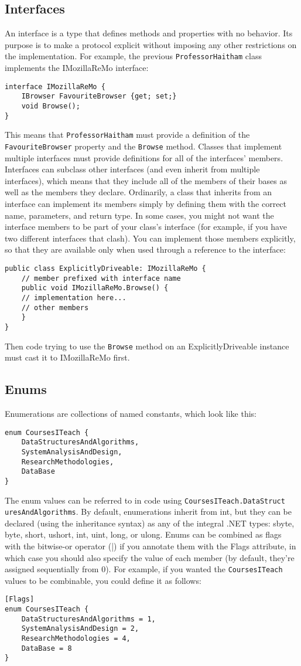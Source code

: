 \documentclass[12pt,a4paper,final,twoside,onecolumn,titlepage]{book}
\begin{document}
\subsection{Interfaces}
An interface is a type that defines methods and properties with no behavior. Its purpose is to make a protocol explicit without imposing any other restrictions on the implementation. For example, the previous \texttt{ProfessorHaitham} class implements the IMozillaReMo interface:
\begin{lstlisting}
interface IMozillaReMo {
	IBrowser FavouriteBrowser {get; set;} 
	void Browse();
}
\end{lstlisting}
This means that \texttt{ProfessorHaitham} must provide a definition of the \texttt{FavouriteBrowser} property and the \texttt{Browse} method. Classes that implement multiple interfaces must provide definitions for all of the interfaces’ members. Interfaces can subclass other interfaces (and even inherit from multiple interfaces), which means that they include all of the members of their bases as well as the members they declare.
Ordinarily, a class that inherits from an interface can implement its members simply by defining them with the correct name, parameters, and return type. In some cases, you might not want the interface members to be part of your class’s interface (for example, if you have two different interfaces that clash). You can implement those members explicitly, so that they are available only when used through a reference to the interface:
\begin{lstlisting}
public class ExplicitlyDriveable: IMozillaReMo { 
	// member prefixed with interface name 
	public void IMozillaReMo.Browse() {
	// implementation here... 
	// other members
	}
}
\end{lstlisting}
Then code trying to use the \texttt{Browse} method on an ExplicitlyDriveable instance
must cast it to IMozillaReMo first.
\subsection{Enums}
Enumerations are collections of named constants, which look like this:
\begin{lstlisting}
enum CoursesITeach { 
	DataStructuresAndAlgorithms,
	SystemAnalysisAndDesign, 
	ResearchMethodologies, 
	DataBase
}
\end{lstlisting}
The enum values can be referred to in code using \texttt{CoursesITeach.DataStruct\\uresAndAlgorithms}. By default, enumerations inherit from int, but they can be declared (using the inheritance syntax) as any of the integral .NET types: sbyte, byte, short, ushort, int, uint, long, or ulong. Enums can be combined as flags with the bitwise-or operator (|) if you annotate them with the Flags attribute, in which case you should also specify the value of each member (by default, they’re assigned sequentially from 0). For example, if you wanted the \texttt{CoursesITeach} values to be combinable, you could define it as follows:
\begin{lstlisting}
[Flags] 
enum CoursesITeach {
	DataStructuresAndAlgorithms = 1, 
	SystemAnalysisAndDesign = 2, 
	ResearchMethodologies = 4, 
	DataBase = 8
}
\end{lstlisting}
\end{document}
